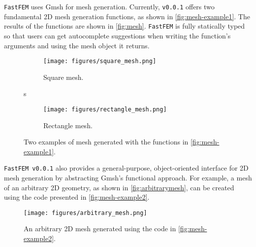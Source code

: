
\texttt{FastFEM} uses Gmsh\supercite{Gmsh} for mesh generation. Currently, \texttt{v0.0.1} offers two fundamental 2D mesh generation functions, as shown in \autoref{fig:mesh-example1}.  The results of the functions are shown in \autoref{fig:mesh}. \texttt{FastFEM} is fully statically typed so that users can get autocomplete suggestions when writing the function's arguments and using the mesh object it returns.


\begin{figure}[H]
    \centering
    \hfill
    \begin{subfigure}[c]{0.4\textwidth}
        \centering
        \texttt{[image: figures/square\_mesh.png]}

        \caption{Square mesh.}
        \label{fig:square}
    \end{subfigure}s
    \hspace{0.1\textwidth}
    \begin{subfigure}[c]{0.4\textwidth}
        \centering
        \texttt{[image: figures/rectangle\_mesh.png]}
        \caption{Rectangle mesh.}
        \label{fig:rectangle}
    \end{subfigure}
    \caption{Two examples of mesh generated with the functions in \autoref{fig:mesh-example1}.}
    \label{fig:mesh}
    \hfill
\end{figure}

\texttt{FastFEM v0.0.1} also provides a general-purpose, object-oriented interface for 2D mesh generation by abstracting Gmsh's functional approach. For example, a mesh of an arbitrary 2D geometry, as shown in \autoref{fig:arbitrarymesh}, can be created using the code presented in \autoref{fig:mesh-example2}.


\begin{figure}[H]
    \centering
    \texttt{[image: figures/arbitrary\_mesh.png]}
    \caption{An arbitrary 2D mesh generated using the code in \autoref{fig:mesh-example2}.}
    \label{fig:arbitrarymesh}
\end{figure}